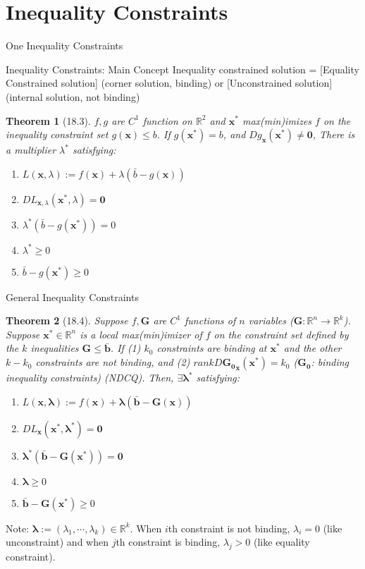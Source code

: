 \documentclass[a4paper,11pt]{article}
\newtheorem{thm}{Theorem}
\newcommand{\bb}{\mathbb}
\newcommand{\bd}{\mathbf}
\begin{document}
\section{Inequality Constraints} %
\label{sec:inequality_constraints}
\begin{frame}[t]{One Inequality Constraints}
	\begin{block}
		{Inequality Constraints: Main Concept}
		Inequality constrained solution = [Equality Constrained solution] (corner solution, binding) or [Unconstrained solution] (internal solution, not binding)
	\end{block}
	\begin{thm}
		[18.3] $f,g$ are $C^1$ function on $\bb{R}^2$ and $\bd{x^\ast}$ max(min)imizes $f$ on the inequality constraint set $g(\bd{x})\le b$. If $g(\bd{x^\ast})=b$, and $Dg_{\bd{x}}(\bd{x^\ast})\neq \bd{0}$, There is a multiplier $\lambda^\ast$ satisfying:
		\begin{enumerate}
			\item $L(\bd{x},\lambda):=f(\bd{x})+\lambda(\bar{b}-g(\bd{x}))$
			\item $DL_{\bd{x},\lambda}(\bd{x^\ast},\lambda)=\bd{0}$
			\item $\lambda^\ast(\bar{b}-g(\bd{x^\ast}))=0$
			\item $\lambda^\ast\ge 0$
			\item $\bar{b}-g(\bd{x^\ast})\ge 0$
		\end{enumerate}
	\end{thm}
\end{frame}

\begin{frame}[t]{General Inequality Constraints}
	\begin{thm}
		[18.4] Suppose $f,\bd{G}$ are $C^1$ functions of $n$ variables ($\bd{G}:\bb{R}^n\rightarrow\bb{R}^k$). Suppose $\bd{x^\ast}\in\bb{R}^n$ is a local max(min)imizer of $f$ on the constraint set defined by the $k$  inequalities $\bd{G}\le \bar{\bd{b}}$. If (1) $k_0$ constraints are binding at $\bd{x^\ast}$ and the other $k-k_0$ constraints are not binding, and (2) $rank D\bd{G_0}_{\bd{x}}(\bd{x^\ast})= k_0$ ($\bd{G_0}$: binding inequality constraints) (NDCQ). Then, $\exists\bd{\lambda^\ast}$ satisfying:
		\begin{enumerate}
			\item $L(\bd{x},\bd{\lambda}):=f(\bd{x})+\bd{\lambda}(\bar{\bd{b}}-\bd{G}(\bd{x}))$
			\item $DL_{\bd{x}}(\bd{x^\ast,\lambda^\ast})=\bd{0}$
			\item $\bd{\lambda^\ast}(\bar{\bd{b}}-\bd{G}(\bd{x^\ast}))=\bd{0}$
			\item $\bd{\lambda}\ge 0$
			\item $\bar{\bd{b}}-\bd{G}(\bd{x^\ast})\ge 0$
		\end{enumerate}
	\end{thm}
	Note: $\bd{\lambda}:=(\lambda_1,\cdots,\lambda_k)\in \bb{R}^k$. When $i$th constraint is not binding, $\lambda_i=0$ (like unconstraint) and when $j$th constraint is binding, $\lambda_j> 0$ (like equality constraint). 
\end{frame}
\end{document}
